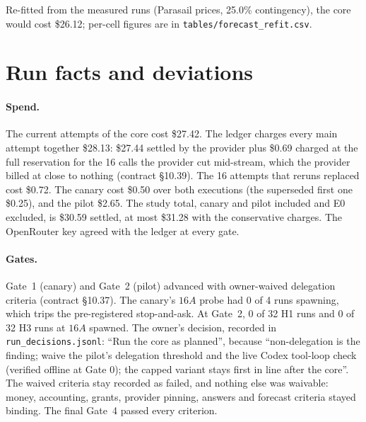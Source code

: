\documentclass[11pt]{article}
\begin{document}
Re-fitted from the measured runs (Parasail prices, 25.0\% contingency), the core would cost
\$26.12; per-cell figures are in \texttt{tables/forecast\_refit.csv}.

\appendix
\section{Run facts and deviations}
\label{app:facts}

\paragraph{Spend.} The current attempts of the core cost \$27.42. The ledger charges every main attempt together
\$28.13: \$27.44 settled by the provider plus
\$0.69 charged at the full reservation for the
16 calls the provider cut mid-stream, which the provider billed at close to
nothing (contract \S10.39). The 16 attempts that reruns replaced cost \$0.72. The canary cost
\$0.50 over both executions (the superseded first one
\$0.25), and the pilot \$2.65. The study total,
canary and pilot included and E0 excluded, is \$30.59 settled, at most
\$31.28 with the conservative charges. The OpenRouter key agreed with the ledger at every
gate.

\paragraph{Gates.} Gate~1 (canary) and Gate~2 (pilot) advanced with owner-waived delegation criteria (contract
\S10.37). The canary's $16A$ probe had 0 of 4
runs spawning, which trips the pre-registered stop-and-ask. At Gate~2, 0 of
32 H1 runs and 0 of 32
H3 runs at $16A$ spawned. The owner's decision, recorded in
\texttt{run\_decisions.jsonl}: ``Run the core as planned'', because ``non-delegation is the finding; waive the pilot's delegation threshold and the live Codex tool-loop check (verified offline at Gate 0); the capped variant stays first in line after the core''.
The waived criteria stay recorded as failed, and nothing else was waivable: money, accounting, grants, provider
pinning, answers and forecast criteria stayed binding. The final Gate~4 passed every criterion.
\end{document}
